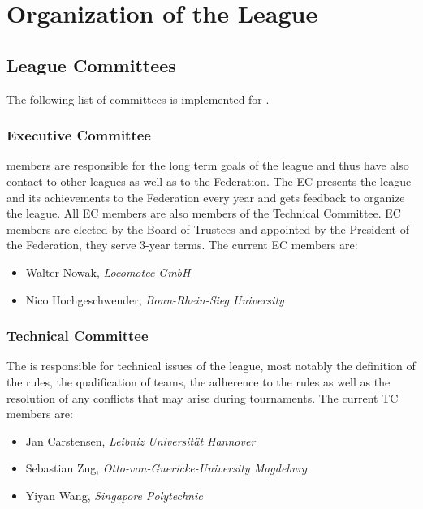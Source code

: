 \section{Organization of the League}\label{sec:organisation_of_the_league}

\subsection{League Committees}
The following list of committees is implemented for \RCAW.

\subsubsection{Executive Committee}

 members are responsible for the long term goals of the league and thus have also contact to other leagues as well as to the \RC Federation. The EC presents the league and its achievements to the \RC Federation every year and gets feedback to organize the league. All EC members are also members of the Technical Committee. EC members are elected by the Board of Trustees and appointed by the President of the \RC Federation, they serve 3-year terms. The current EC members are:

\begin{itemize}
	\item Walter Nowak, \textit{Locomotec GmbH}
	\item Nico Hochgeschwender, \textit{Bonn-Rhein-Sieg University}
\end{itemize}


\subsubsection{Technical Committee}
The  is responsible for technical issues of the league, most notably the definition of the rules, the qualification of teams, the adherence to the rules as well as the resolution of any conflicts that may arise during tournaments. The current TC members are:

\begin{itemize}
	\item Jan Carstensen, \textit{Leibniz Universit\"at Hannover}
	\item Sebastian Zug, \textit{Otto-von-Guericke-University Magdeburg}
	\item Yiyan Wang, \textit{Singapore Polytechnic}
\end{itemize}


